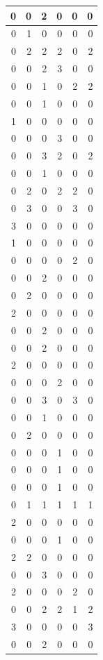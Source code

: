 \documentclass[
]{article}
\begin{document}
\begin{tabular}{r|r|r|r|r|r}
\hline
0 & 0 & 2 & 0 & 0 & 0\\
\hline
0 & 1 & 0 & 0 & 0 & 0\\
\hline
0 & 2 & 2 & 2 & 0 & 2\\
\hline
0 & 0 & 2 & 3 & 0 & 0\\
\hline
0 & 0 & 1 & 0 & 2 & 2\\
\hline
0 & 0 & 1 & 0 & 0 & 0\\
\hline
1 & 0 & 0 & 0 & 0 & 0\\
\hline
0 & 0 & 0 & 3 & 0 & 0\\
\hline
0 & 0 & 3 & 2 & 0 & 2\\
\hline
0 & 0 & 1 & 0 & 0 & 0\\
\hline
0 & 2 & 0 & 2 & 2 & 0\\
\hline
0 & 3 & 0 & 0 & 3 & 0\\
\hline
3 & 0 & 0 & 0 & 0 & 0\\
\hline
1 & 0 & 0 & 0 & 0 & 0\\
\hline
0 & 0 & 0 & 0 & 2 & 0\\
\hline
0 & 0 & 2 & 0 & 0 & 0\\
\hline
0 & 2 & 0 & 0 & 0 & 0\\
\hline
2 & 0 & 0 & 0 & 0 & 0\\
\hline
0 & 0 & 2 & 0 & 0 & 0\\
\hline
0 & 0 & 2 & 0 & 0 & 0\\
\hline
2 & 0 & 0 & 0 & 0 & 0\\
\hline
0 & 0 & 0 & 2 & 0 & 0\\
\hline
0 & 0 & 3 & 0 & 3 & 0\\
\hline
0 & 0 & 1 & 0 & 0 & 0\\
\hline
0 & 2 & 0 & 0 & 0 & 0\\
\hline
0 & 0 & 0 & 1 & 0 & 0\\
\hline
0 & 0 & 0 & 1 & 0 & 0\\
\hline
0 & 0 & 0 & 1 & 0 & 0\\
\hline
0 & 1 & 1 & 1 & 1 & 1\\
\hline
2 & 0 & 0 & 0 & 0 & 0\\
\hline
0 & 0 & 0 & 1 & 0 & 0\\
\hline
2 & 2 & 0 & 0 & 0 & 0\\
\hline
0 & 0 & 3 & 0 & 0 & 0\\
\hline
2 & 0 & 0 & 0 & 2 & 0\\
\hline
0 & 0 & 2 & 2 & 1 & 2\\
\hline
3 & 0 & 0 & 0 & 0 & 3\\
\hline
0 & 0 & 2 & 0 & 0 & 0\\

\end{tabular}
\end{document}
